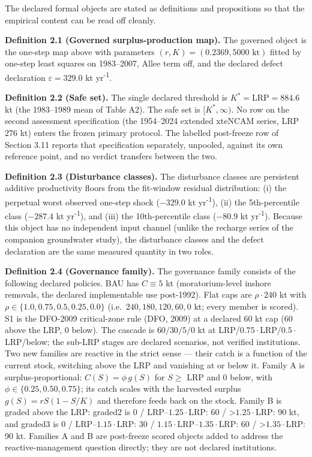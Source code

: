 The declared formal objects are stated as definitions and propositions
so that the empirical content can be read off cleanly.

\textbf{Definition 2.1 (Governed surplus-production map).} The governed
object is the one-step map above with parameters
\((r, K) = (0.2369, 5000\text{ kt})\) fitted by one-step least squares
on 1983--2007, Allee term off, and the declared defect declaration
\(\varepsilon = 329.0\) kt yr\textsuperscript{-1}.

\textbf{Definition 2.2 (Safe set).} The single declared threshold is
\(K^* = \mathrm{LRP} = 884.6\) kt (the 1983--1989 mean of Table A2). The
safe set is \([K^*, \infty)\). No row on the second assessment
specification (the 1954--2024 extended xteNCAM series, LRP \(276\) kt)
enters the frozen primary protocol. The labelled post-freeze row of
Section 3.11 reports that specification separately, unpooled, against
its own reference point, and no verdict transfers between the two.

\textbf{Definition 2.3 (Disturbance classes).} The disturbance classes
are persistent additive productivity floors from the fit-window residual
distribution: (i) the perpetual worst observed one-step shock
(\(-329.0\) kt yr\textsuperscript{-1}), (ii) the 5th-percentile class (\(-287.4\) kt
yr\textsuperscript{-1}), and (iii) the 10th-percentile class (\(-80.9\) kt yr\textsuperscript{-1}). Because
this object has no independent input channel (unlike the recharge series
of the companion groundwater study), the disturbance classes and the
defect declaration are the same measured quantity in two roles.

\textbf{Definition 2.4 (Governance family).} The governance family
consists of the following declared policies. BAU has \(C \equiv 5\) kt
(moratorium-level inshore removals, the declared implementable use
post-1992). Flat caps are \(\rho \cdot 240\) kt with
\(\rho \in \{1.0, 0.75, 0.5, 0.25, 0.0\}\)
(i.e.~\(240, 180, 120, 60, 0\) kt; every member is scored). S1 is the
DFO-2009 critical-zone rule (DFO, 2009) at a declared \(60\) kt cap
(\(60\) above the LRP, \(0\) below). The cascade is \(60/30/5/0\) kt at
LRP/\(0.75\cdot\)LRP/\(0.5\cdot\)LRP/below; the sub-LRP stages are
declared scenarios, not verified institutions. Two new families are
reactive in the strict sense --- their catch is a function of the
current stock, switching above the LRP and vanishing at or below it.
Family A is surplus-proportional: \(C(S) = \phi\, g(S)\) for \(S \ge\)
LRP and 0 below, with \(\phi \in \{0.25, 0.50, 0.75\}\); its catch
scales with the harvested surplus \(g(S) = rS(1 - S/K)\) and therefore
feeds back on the stock. Family B is graded above the LRP: graded2 is 0
/ LRP--\(1.25\cdot\)LRP: 60 / \textgreater{}\(1.25\cdot\)LRP: 90 kt, and
graded3 is 0 / LRP--\(1.15\cdot\)LRP: 30 /
\(1.15\cdot\)LRP--\(1.35\cdot\)LRP: 60 / \textgreater{}\(1.35\cdot\)LRP:
90 kt. Families A and B are post-freeze scored objects added to address
the reactive-management question directly; they are not declared
institutions.

